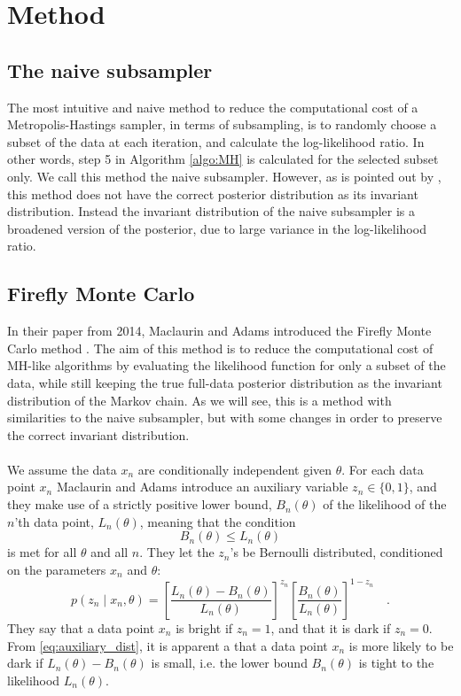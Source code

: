 \chapter{Method}\label{chap:method}
\label{sec:second}
\section{The naive subsampler}\label{subsec:naive}
The most intuitive and naive method to reduce the computational cost of a Metropolis-Hastings sampler, in terms of subsampling, is to randomly choose a subset of the data at each iteration, and calculate the log-likelihood ratio. In other words, step 5 in Algorithm \ref{algo:MH} is calculated for the selected subset only. We call this method the naive subsampler.  However, as is pointed out by \cite{Bardenet:1}, this method does not have the correct posterior distribution as its invariant distribution. Instead the invariant distribution of the naive subsampler is a broadened version of the posterior, due to large variance in the log-likelihood ratio. 
 \section{Firefly Monte Carlo}\label{sec:Firefly}
In their paper from 2014, Maclaurin and Adams  introduced the Firefly Monte Carlo method \cite{Maclaurin:1}. 
The aim of this method is to reduce the computational cost of MH-like algorithms by evaluating the likelihood function for only a subset of the data, while still keeping the true full-data posterior distribution as the invariant distribution of the Markov chain. As we will see, this is a method with similarities to the naive subsampler, but with some changes in order to preserve the correct invariant distribution.  \\ \\
We assume the data $x_n$ are conditionally independent given $\theta$.
For each data point $x_n$ Maclaurin and Adams introduce an auxiliary variable $z_n \in \{0, 1\}$, and they make use of a strictly positive lower bound, $B_n\left(\theta\right)$ of the likelihood of the $n$'th data point, $L_n\left(\theta\right)$, meaning that the condition 
\begin{equation}
    B_n\left(\theta\right) \leq L_n\left(\theta\right)
\end{equation} is met for all $\theta$ and all $n$. 
They let the $z_n$'s be  Bernoulli distributed, conditioned on the parameters $x_n$ and $\theta$: 
\begin{equation}\label{eq:auxiliary_dist}
    p(z_n\mid x_n,\theta) = \left[\frac{L_n(\theta) - B_n(\theta)}{L_n(\theta)}\right]^{z_n}\left[\frac{B_n(\theta)}{L_n(\theta)}\right]^{1-z_n} \quad .
\end{equation}
They say that a data point $x_n$ is bright if $z_n = 1$, and that it is dark if $z_n = 0$. 
From \eqref{eq:auxiliary_dist}, it is apparent a  that a data point $x_n$ is more likely to be dark if $L_n(\theta) - B_n(\theta)$ is small, i.e. the lower bound $B_n(\theta)$ is tight to the likelihood $L_n(\theta)$. 

